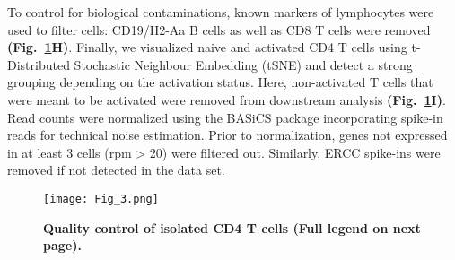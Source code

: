 To control for biological contaminations, known markers of lymphocytes were used to filter cells: CD19\plus{}/H2-Aa\plus{} B cells as well as CD8\plus{} T cells were removed \textbf{(Fig.~\ref{fig1:QC}H)}. Finally, we visualized naive and activated CD4\plus{} T cells using t-Distributed Stochastic Neighbour Embedding (tSNE) and detect a strong grouping depending on the activation status. Here, non-activated T cells that were meant to be activated were removed from downstream analysis \textbf{(Fig.~\ref{fig1:QC}I)}. Read counts were normalized using the BASiCS package \citep{Vallejos2015} incorporating spike-in reads for technical noise estimation. Prior to normalization, genes not expressed in at least 3 cells (rpm > 20) were filtered out. Similarly, ERCC spike-ins were removed if not detected in the data set.

\newpage

\begin{figure}[!hb]
\centering
\texttt{[image: Fig\_3.png]}
\caption[Quality control of isolated CD4\plus{} T cells]{\textbf{Quality control of isolated CD4\plus{} T cells (Full legend on next page).}\\}
\label{fig1:QC}
\end{figure}

\newpage


